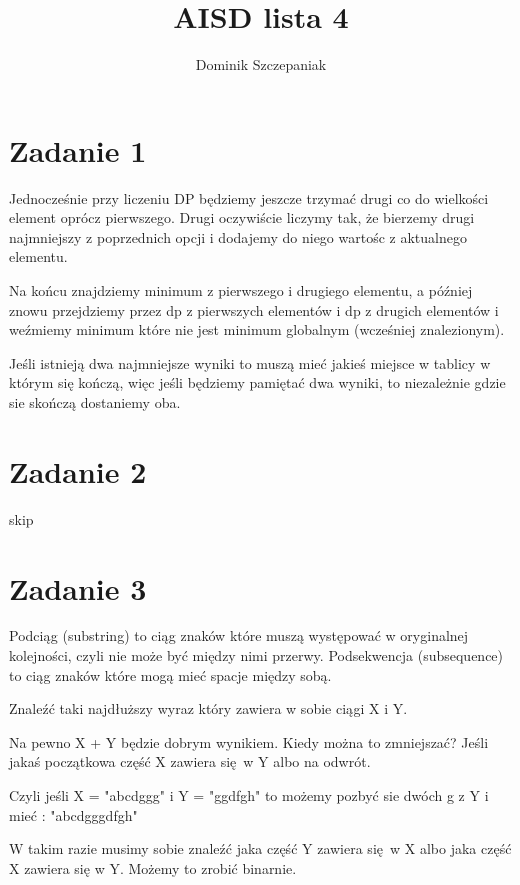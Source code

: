 \documentclass[12pt]{article}
\title{AISD lista 4}
\author{Dominik Szczepaniak}
\begin{document}
\maketitle

\bgroup\obeylines



\section{Zadanie 1}
Jednocześnie przy liczeniu DP będziemy jeszcze trzymać drugi co do wielkości element oprócz pierwszego. 
Drugi oczywiście liczymy tak, że bierzemy drugi najmniejszy z poprzednich opcji i dodajemy do niego wartośc z aktualnego elementu.

Na końcu znajdziemy minimum z pierwszego i drugiego elementu, a później znowu przejdziemy przez dp z pierwszych elementów i dp z drugich elementów i weźmiemy minimum które nie jest minimum globalnym (wcześniej znalezionym).



Jeśli istnieją dwa najmniejsze wyniki to muszą mieć jakieś miejsce w tablicy w którym się kończą, więc jeśli będziemy pamiętać dwa wyniki, to niezależnie gdzie sie skończą dostaniemy oba.

\section{Zadanie 2}
skip

\section{Zadanie 3}
Podciąg (substring) to ciąg znaków które muszą występować w oryginalnej kolejności, czyli nie może być między nimi przerwy.
Podsekwencja (subsequence) to ciąg znaków które mogą mieć spacje między sobą.

Znaleźć taki najdłuższy wyraz który zawiera w sobie ciągi X i Y. 

Na pewno X + Y będzie dobrym wynikiem.
Kiedy można to zmniejszać? Jeśli jakaś początkowa część X zawiera się w Y albo na odwrót.

Czyli jeśli X = "abcdggg" i Y = "ggdfgh" to możemy pozbyć sie dwóch g z Y i mieć :
"abcdgggdfgh"

W takim razie musimy sobie znaleźć jaka część Y zawiera się w X albo jaka część X zawiera się w Y. Możemy to zrobić binarnie.
\end{document}
